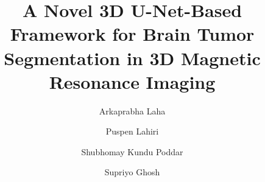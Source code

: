 \documentclass[a4paper,fleqn]{../cas-dc}
\begin{document}
\let\WriteBookmarks\relax
\raggedbottom
\renewcommand{\topfraction}{.95}
\renewcommand{\bottomfraction}{.85}
\renewcommand{\textfraction}{.05}
\renewcommand{\floatpagefraction}{.8}
\renewcommand{\dbltopfraction}{.95}
\renewcommand{\dblfloatpagefraction}{.8}
\setcounter{topnumber}{5}
\setcounter{bottomnumber}{5}
\setcounter{totalnumber}{10}
\setcounter{dbltopnumber}{5}
\setlength{\dbltextfloatsep}{6pt plus 2pt minus 2pt}
\setlength{\textfloatsep}{6pt plus 2pt minus 2pt}





\title [mode = title]{A Novel 3D U-Net-Based Framework for Brain Tumor Segmentation in 3D Magnetic Resonance Imaging}




%

\author[1,4]{Arkaprabha Laha}
\cormark[1]

\author[1,3]{Puspen Lahiri}

\author[1]{Shubhomay Kundu Poddar}

\author[1]{Supriyo Ghosh}
\end{document}
